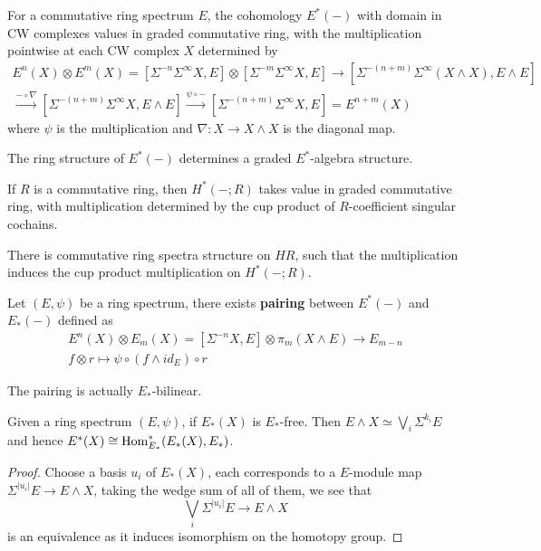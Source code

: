 \begin{definition}
For a commutative ring spectrum $E$, the cohomology $E^*(-)$ with domain in CW complexes values in graded commutative ring, with the multiplication pointwise at each CW complex $X$ determined by 
    \begin{align*}
E^n(X)\otimes E^m(X)=[\Sigma^{-n}\Sigma^∞ X, E]\otimes[\Sigma^{-m}\Sigma^∞ X, E]\to [\Sigma^{-(n+m)}\Sigma^∞ (X\wedge X), E\wedge E]
\\ \xrightarrow{-\circ \nabla} [\Sigma^{-(n+m)}\Sigma^∞ X, E\wedge E]\xrightarrow{\psi \circ -}[\Sigma^{-(n+m)}\Sigma^∞ X, E]=E^{n+m}(X)
    \end{align*}where $\psi$ is the multiplication and $\nabla: X\to X\wedge X$ is the diagonal map.
\end{definition}

\begin{proposition}
    The ring structure of $E^*(-)$ determines a graded $E^*$-algebra structure.
\end{proposition}

If $R$ is a commutative ring, then $H^*(-;R)$ takes value in graded commutative ring, with multiplication determined by the cup product of $R$-coefficient singular cochains. 
\begin{proposition}
\cite{PreRudyak} 
There is commutative ring spectra structure on $HR$, such that the multiplication induces the cup product multiplication on $H^*(-;R)$.
\end{proposition}
 
\begin{definition}
    Let $(E,\psi)$ be a ring spectrum, there exists \textbf{pairing} between $E^*(-)$ and $E_*(-)$ defined as
    \begin{align*}
    E^n(X)\otimes E_m(X)=[\Sigma^{-n}X, E]\otimes\pi_m(X\wedge E)\to E_{m-n}
        \\ f\otimes r\mapsto \psi \circ (f\wedge id_E)\circ r
    \end{align*}
\end{definition}

The pairing is actually $E_*$-bilinear.

\begin{lemma}
    Given a ring spectrum $(E,\psi)$, if $E_*(X)$ is $E_*$-free. Then $E\wedge X\simeq \bigvee_i \Sigma^{k_i}E$ and hence $E^*(X)\cong \operatorname{Hom}_{E_*}^*(E_*(X),E_*)$.
\end{lemma}
\begin{proof}
   Choose a basis $u_i$ of $E_*(X)$, each corresponds to a $E$-module map $\Sigma^{|u_i|}E\to E\wedge X$, taking the wedge sum of all of them, we see that
   \[
   \bigvee_{i}\Sigma^{|u_i|}E\to E\wedge X
   \]is an equivalence as it induces isomorphism on the homotopy group.

\end{proof}

